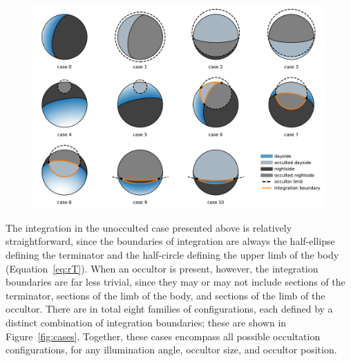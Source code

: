 \documentclass[modern]{aastex62}
\begin{document}
\begin{figure}[t!]
    \begin{centering}
        \includegraphics[width=\linewidth]{figures/cases.pdf}
    \end{centering}
\end{figure}

The integration in the unocculted case presented above is relatively
straightforward, since
the boundaries of integration are always the half-ellipse defining the
terminator and the half-circle defining the upper limb of the body
(Equation~\ref{eq:rT}). When an occultor is present, however, the
integration boundaries are far less trivial, since they may or may not
include sections of the terminator, sections of the limb of the body,
and sections of the limb of the occultor. There are in total eight families of
configurations, each defined by a distinct combination of integration
boundaries; these are shown in Figure~\ref{fig:cases}.
Together, these cases encompass all possible
occultation configurations, for any illumination angle, occultor size, and
occultor position.
\end{document}
